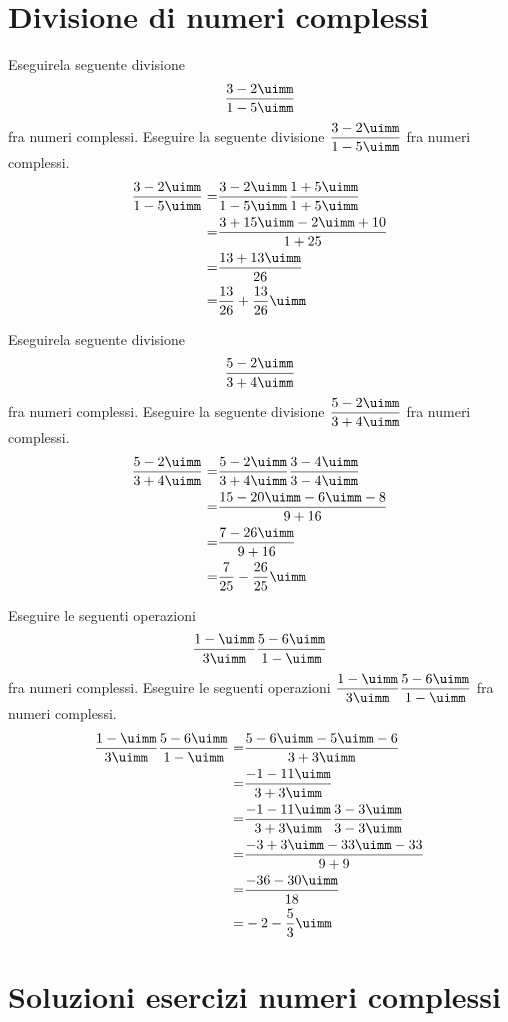  \section{Divisione di  numeri complessi}
 \begin{exercise}
Eseguirela seguente divisione \[\dfrac{3-2\uimm}{1-5\uimm} \] fra numeri complessi.
\tcblower
Eseguire la seguente divisione  $\dfrac{3-2\uimm}{1-5\uimm}$ fra numeri complessi.
\begin{align*}
\dfrac{3-2\uimm}{1-5\uimm}=&\dfrac{3-2\uimm}{1-5\uimm}\dfrac{1+5\uimm}{1+5\uimm}\\
=&\dfrac{3+15\uimm-2\uimm+10}{1+25}\\
=&\dfrac{13+13\uimm}{26}\\
=&\dfrac{13}{26}+\dfrac{13}{26}\uimm\\
\end{align*}
 \end{exercise}
 \begin{exercise}
	Eseguirela seguente divisione \[\dfrac{5-2\uimm}{3+4\uimm} \] fra numeri complessi.
	\tcblower
	Eseguire la seguente divisione  $\dfrac{5-2\uimm}{3+4\uimm}$ fra numeri complessi.
	\begin{align*}
	\dfrac{5-2\uimm}{3+4\uimm}=&\dfrac{5-2\uimm}{3+4\uimm}\dfrac{3-4\uimm}{3-4\uimm}\\
	=&\dfrac{15-20\uimm-6\uimm-8}{9+16}\\
	=&\dfrac{7-26\uimm}{9+16}\\
	=&\dfrac{7}{25}-\dfrac{26}{25}\uimm\\
	\end{align*}
\end{exercise}
 \begin{exercise}
	Eseguire le seguenti operazioni  \[\dfrac{1-\uimm}{3\uimm}\dfrac{5-6\uimm}{1-\uimm}\] fra numeri complessi.
	\tcblower
	Eseguire le seguenti operazioni  $\dfrac{1-\uimm}{3\uimm}\dfrac{5-6\uimm}{1-\uimm}$ fra numeri complessi.
	\begin{align*}
	\dfrac{1-\uimm}{3\uimm}\dfrac{5-6\uimm}{1-\uimm}=&\dfrac{5-6\uimm-5\uimm-6}{3+3\uimm}\\
	=&\dfrac{-1-11\uimm}{3+3\uimm}\\
	=&\dfrac{-1-11\uimm}{3+3\uimm}\dfrac{3-3\uimm}{3-3\uimm}\\
	=&\dfrac{-3+3\uimm-33\uimm-33}{9+9}\\
	=&\dfrac{-36-30\uimm}{18}\\
	=&-2-\dfrac{5}{3}\uimm
	\end{align*}
\end{exercise}

\tcbstoprecording
 \section{Soluzioni esercizi numeri complessi}
 \tcbinputrecords
 